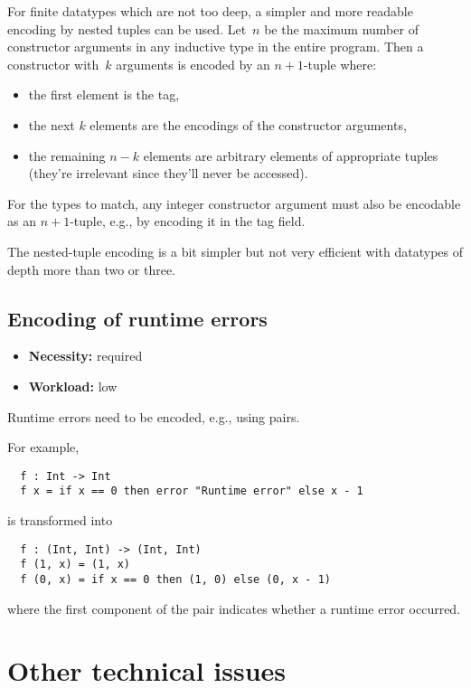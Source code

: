 For finite datatypes which are not too deep, a simpler and more
readable encoding by nested tuples can be used. Let~$n$ be the maximum
number of constructor arguments in any inductive type in the entire
program. Then a constructor with~$k$ arguments is encoded by an
$n+1$-tuple where:
\begin{itemize}
\item the first element is the tag,
\item the next $k$ elements are the encodings of the constructor arguments,
\item the remaining $n - k$ elements are arbitrary elements of
  appropriate tuples (they're irrelevant since they'll never be
  accessed).
\end{itemize}
For the types to match, any integer constructor argument must also be
encodable as an $n+1$-tuple, e.g., by encoding it in the tag
field.

The nested-tuple encoding is a bit simpler but not very efficient with
datatypes of depth more than two or three.

\subsection{Encoding of runtime errors}\label{sec_errors}

\begin{itemize}
\item {\bf Necessity:} required
\item {\bf Workload:} low
\end{itemize}

\noindent Runtime errors need to be encoded, e.g., using pairs.

\medskip

\noindent For example,
\begin{verbatim}
  f : Int -> Int
  f x = if x == 0 then error "Runtime error" else x - 1
\end{verbatim}
is transformed into
\begin{verbatim}
  f : (Int, Int) -> (Int, Int)
  f (1, x) = (1, x)
  f (0, x) = if x == 0 then (1, 0) else (0, x - 1)
\end{verbatim}
where the first component of the pair indicates whether a runtime
error occurred.

\clearpage
\section{Other technical issues}\label{sec_issues}

